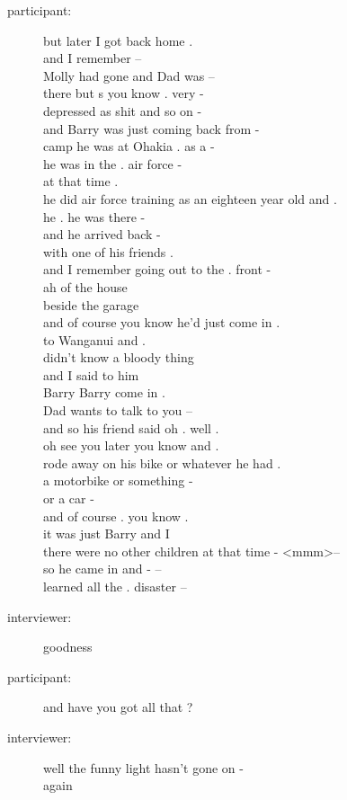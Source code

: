 \documentclass{article}
\newcommand{\turn}[2]{
\item[#1:] #2
}
\begin{document}
\begin{description}
\turn{participant}{but later I got back home .\\
and I remember --\\
Molly had gone and Dad was --\\
there but s you know . very -\\
depressed as shit and so on -\\
and Barry was just coming back from -\\
camp he was at Ohakia . as a -\\
he was in the . air force -\\
at that time .\\
he did air force training as an eighteen year old and .\\
he . he was there -\\
and he arrived back -\\
with one of his friends .\\
and I remember going out to the . front -\\
ah of the house\\
beside the garage\\
and of course you know he'd just come in .\\
to Wanganui and .\\
didn't know a bloody thing\\
and I said to him\\
Barry Barry come in .\\
Dad wants to talk to you --\\
and so his friend said oh . well .\\
oh see you later you know and .\\
rode away on his bike or whatever he had .\\
a motorbike or something -\\
or a car -\\
and of course . you know .\\
it was just Barry and I\\
there were no other children at that time - \textless mmm\textgreater  --\\
so he came in and - --\\
learned all the . disaster --}

\turn{interviewer}{goodness}

\turn{participant}{and have you got all that ?}

\turn{interviewer}{ well the funny light hasn't gone on -\\
again}


\end{description}
\end{document}
